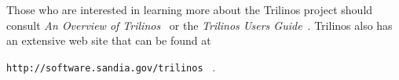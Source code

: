 \documentclass[12pt,relax]{article}
\newcommand{\InlineDirectory}[1]{
  {\hspace{0.01 in}} {\tt #1} {\hspace{0.01 in}}}
\begin{document}
Those who are interested in learning more about the Trilinos project should 
consult {\it An Overview of Trilinos}~\cite{Trilinos-Overview} or the
{\it Trilinos Users Guide}~\cite{Trilinos-Users-Guide}.  Trilinos also has an 
extensive web site that can be found at \newline
\InlineDirectory{http://software.sandia.gov/trilinos}~\cite{Trilinos-home-page}.

\clearpage



%

\end{document}
